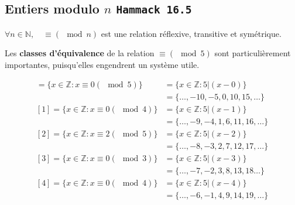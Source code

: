 \documentclass[16pt]{report}
\begin{document}
\begin{multicols*}{2}
        \section{Entiers modulo $n$ \texttt{\small{Hammack 16.5}}}
 
            
                \begin{Theoremcon}{}
                    $\forall n \in \mathbb{N}, \quad \equiv (\mod{n}) $ est une relation
                    réflexive, transitive et symétrique.
                \end{Theoremcon}


                Les \textbf{classes d'équivalence} de la relation $ \equiv (\mod{5})$
                sont particulièrement importantes, puisqu'elles engendrent un système utile. 

                \begin{align*}
                    [0] = \{ x \in \mathbb{Z} : x \equiv 0 (\mod{5})\} &= \{ x \in \mathbb{Z}: 5|(x-0)\} \\ 
                                                    &= \{ \dots , -10, -5, 0, 10, 15, \dots \} 
                                                    \\
                    [1] = \{ x \in \mathbb{Z} : x \equiv 0 (\mod{4})\} &= \{ x \in \mathbb{Z}: 5|(x-1)\} \\ 
                                                    &= \{ \dots , -9, -4, 1, 6, 11, 16, \dots \}
                                                    \\
                    [2] = \{ x \in \mathbb{Z} : x \equiv 2 (\mod{5})\} &= \{ x \in \mathbb{Z}: 5|(x-2)\} \\ 
                                                    &= \{ \dots , -8, -3, 2, 7, 12, 17, \dots \}
                                                    \\
                    [3] = \{ x \in \mathbb{Z} : x \equiv 0 (\mod{3})\} &= \{ x \in \mathbb{Z}: 5|(x-3)\} \\ 
                                                    &= \{ \dots , -7, -2, 3, 8, 13, 18 \dots \}
                                                    \\
                    [4] = \{ x \in \mathbb{Z} : x \equiv 0 (\mod{4})\} &= \{ x \in \mathbb{Z}: 5|(x-4)\} \\ 
                                                    &= \{ \dots , -6, -1, 4, 9, 14, 19, \dots \}
                \end{align*}                


\end{multicols*}
\end{document}
